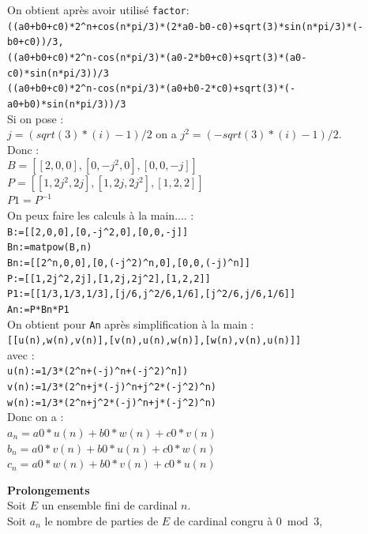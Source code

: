 \documentclass[a4paper,11pt]{book}
\begin{document}
\begin{enumerate}
On obtient apr\`es avoir utilis\'e {\tt factor}:\\
{\tt((a0+b0+c0)*2\verb|^|n+cos(n*pi/3)*(2*a0-b0-c0)+sqrt(3)*sin(n*pi/3)*(-b0+c0))/3,}\\
{\tt ((a0+b0+c0)*2\verb|^|n-cos(n*pi/3)*(a0-2*b0+c0)+sqrt(3)*(a0-c0)*sin(n*pi/3))/3}\\
{\tt ((a0+b0+c0)*2\verb|^|n-cos(n*pi/3)*(a0+b0-2*c0)+sqrt(3)*(-a0+b0)*sin(n*pi/3))/3}\\
Si on pose :\\
$j=(sqrt(3)*(i)-1)/2$ on a $j^2=(-sqrt(3)*(i)-1)/2$.\\
Donc :\\
$B=[[2,0,0],[0,-j^2,0],[0,0,-j]]$\\
$P=[[1,2j^2,2j],[1,2j,2j^2],[1,2,2]]$\\
$P1=P^{-1}$\\
On peux faire les calculs \`a la main.... :\\
{\tt B:=[[2,0,0],[0,-j\verb|^|2,0],[0,0,-j]]}\\
{\tt Bn:=matpow(B,n)}\\
{\tt Bn:=[[2\verb|^|n,0,0],[0,(-j\verb|^|2)\verb|^|n,0],[0,0,(-j)\verb|^|n]]}\\
{\tt P:=[[1,2j\verb|^|2,2j],[1,2j,2j\verb|^|2],[1,2,2]]}\\
{\tt P1:=[[1/3,1/3,1/3],[j/6,j\verb|^|2/6,1/6],[j\verb|^|2/6,j/6,1/6]]}\\
{\tt An:=P*Bn*P1}\\
On obtient pour {\tt An} apr\`es simplification \`a la main :\\
{\tt [[u(n),w(n),v(n)],[v(n),u(n),w(n)],[w(n),v(n),u(n)]]}\\
avec :\\
{\tt u(n):=1/3*(2\verb|^|n+(-j)\verb|^|n+(-j\verb|^|2)\verb|^|n])}\\
{\tt v(n):=1/3*(2\verb|^|n+j*(-j)\verb|^|n+j\verb|^|2*(-j\verb|^|2)\verb|^|n)}\\
{\tt w(n):=1/3*(2\verb|^|n+j\verb|^|2*(-j)\verb|^|n+j*(-j\verb|^|2)\verb|^|n)}\\
Donc on a :\\
$a_n=a0*u(n)+b0*w(n)+c0*v(n)$\\
$b_n=a0*v(n)+b0*u(n)+c0*w(n)$\\
$c_n=a0*w(n)+b0*v(n)+c0*u(n)$
\end{enumerate}
{\bf Prolongements}\\
Soit $E$ un ensemble fini de cardinal $n$.\\
Soit $a_n$ le nombre de parties de $E$ de cardinal congru \`a $0\bmod 3$,\\
\end{document}
